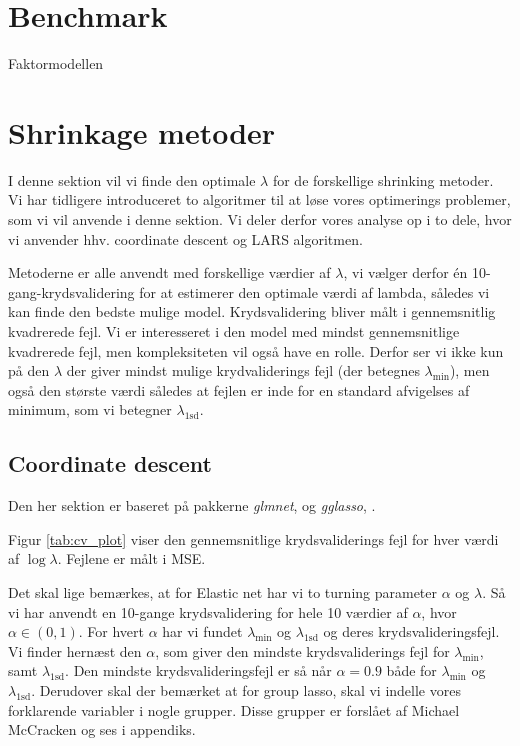 \section{Benchmark}
Faktormodellen


\section{Shrinkage metoder}
I denne sektion vil vi finde den optimale $\lambda$ for de forskellige shrinking metoder. 
Vi har tidligere introduceret to algoritmer til at løse vores optimerings problemer, som vi vil anvende i denne sektion.
Vi deler derfor vores analyse op i to dele, hvor vi anvender hhv. coordinate descent og LARS algoritmen.

Metoderne er alle anvendt med forskellige værdier af $\lambda$, vi vælger derfor én 10-gang-krydsvalidering for at estimerer den optimale værdi af lambda, således vi kan finde den bedste mulige model. 
Krydsvalidering bliver målt i gennemsnitlig kvadrerede fejl. 
Vi er interesseret i den model med mindst gennemsnitlige kvadrerede fejl, men kompleksiteten vil også have en rolle.
Derfor ser vi ikke kun på den $\lambda$ der giver mindst mulige krydvaliderings fejl (der betegnes $\lambda_{\min}$), men også den største værdi således at fejlen er inde for en standard afvigelses af minimum, som vi betegner $\lambda_{\text{1sd}}$.  

\subsection{Coordinate descent}
Den her sektion er baseret på pakkerne \textit{glmnet}, \citep{glmnet} og \textit{gglasso}, \citep{gglasso}.

Figur \ref{tab:cv_plot} viser den gennemsnitlige krydsvaliderings fejl for hver værdi af $\log \lambda$.
Fejlene er målt i MSE.

Det skal lige bemærkes, at for Elastic net har vi to turning parameter $\alpha$ og $\lambda$. 
Så vi har anvendt en 10-gange krydsvalidering for hele 10 værdier af $\alpha$, hvor $\alpha \in (0,1)$. 
For hvert $\alpha$ har vi fundet $\lambda_{\min}$ og $\lambda_{1\text{sd}}$ og deres krydsvalideringsfejl. Vi finder hernæst den $\alpha$, som giver den mindste krydsvaliderings fejl for $\lambda_{\min}$, samt $\lambda_{1\text{sd}}$. 
Den mindste krydsvalideringsfejl er så når  $\alpha = 0.9$ både for $\lambda_{\min}$ og $\lambda_{1\text{sd}}$. 
Derudover skal der bemærket at for group lasso, skal vi indelle vores forklarende variabler i nogle grupper. Disse grupper er forslået af Michael McCracken og ses i appendiks.

